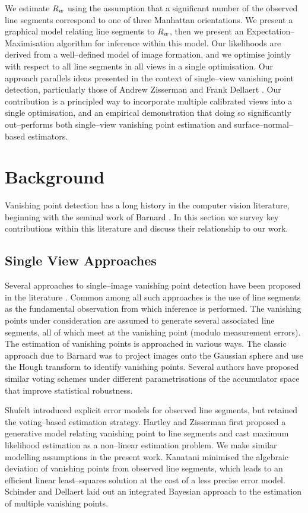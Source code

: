 We estimate $\SceneR$ using the assumption that a significant number
of the observed line segments correspond to one of three Manhattan
orientations. We present a graphical model relating line segments to
$\SceneR$, then we present an Expectation--Maximisation algorithm for
inference within this model. Our likelihoods are derived from a
well--defined model of image formation, and we optimise jointly with
respect to all line segments in all views in a single
optimisation. Our approach parallels ideas presented in the
context of single--view vanishing point detection, particularly those
of Andrew Zisserman \cite{Hartley04} and Frank Dellaert
\cite{Schindler2004}. Our contribution is a principled way to
incorporate multiple calibrated views into a single optimisation, and
an empirical demonstration that doing so significantly out--performs
both single--view vanishing point estimation and
surface--normal--based estimators.

\section{Background}

Vanishing point detection has a long history in the computer vision
literature, beginning with the seminal work of
Barnard \etal \cite{BARNARD1983}. In this section we survey key
contributions within this literature and discuss their relationship to
our work.

\subsection{Single View Approaches}

Several approaches to single--image vanishing point detection have
been proposed in the literature
\cite{BARNARD1983,Zhang02,Shufelt99}. Common among all such approaches
is the use of line segments as the fundamental observation from which
inference is performed. The vanishing points under consideration are
assumed to generate several associated line segments, all of which
meet at the vanishing point (modulo measurement errors). The
estimation of vanishing points is approached in various ways. The
classic approach due to Barnard \cite{BARNARD1983} was to project
images onto the Gaussian sphere and use the Hough transform to
identify vanishing points. Several authors have proposed similar
voting schemes under different parametrisations of the accumulator
space that improve statistical robustness.

Shufelt \cite{Shufelt99} introduced explicit error models for observed
line segments, but retained the voting--based estimation
strategy. Hartley and Zisserman \cite{Hartley04} first proposed a
generative model relating vanishing point to line segments and cast
maximum likelihood estimation as a non--linear estimation problem. We
make similar modelling assumptions in the present
work. Kanatani \cite{Kanatani93} minimised the algebraic deviation of
vanishing points from observed line segments, which leads to an
efficient linear least--squares solution at the cost of a less precise
error model. Schinder and Dellaert \cite{Schindler2004} laid out an
integrated Bayesian approach to the estimation of multiple vanishing
points.

